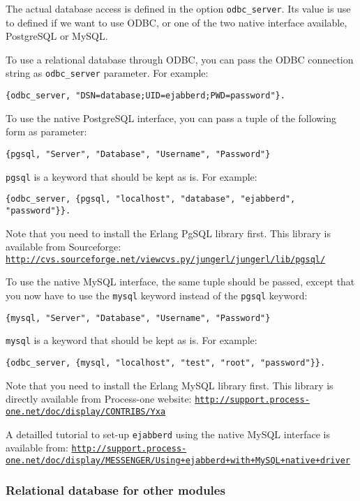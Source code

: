\documentclass[a4paper,10pt]{article}
\newcommand{\term}[1]{\texttt{#1}}
\newcommand{\ejabberd}{\texttt{ejabberd}}
\gdef\ahrefurl#1{\href{#1}{\texttt{#1}}}
\begin{document}
The actual database access is defined in the option \term{odbc\_server}. Its
value is use to defined if we want to use ODBC, or one of the two native
interface available, PostgreSQL or MySQL.

To use a relational database through ODBC, you can pass the ODBC connection
string as \term{odbc\_server} parameter. For example:
\begin{verbatim}
{odbc_server, "DSN=database;UID=ejabberd;PWD=password"}.
\end{verbatim}

To use the native PostgreSQL interface, you can pass a tuple of the following form as
parameter:
\begin{verbatim}
{pgsql, "Server", "Database", "Username", "Password"}
\end{verbatim}

\term{pgsql} is a keyword that should be kept as is. For example:
\begin{verbatim}
{odbc_server, {pgsql, "localhost", "database", "ejabberd", "password"}}.
\end{verbatim}

Note that you need to install the Erlang PgSQL library first. This library is
available from Sourceforge: \ahrefurl{http://cvs.sourceforge.net/viewcvs.py/jungerl/jungerl/lib/pgsql/}

To use the native MySQL interface, the same tuple should be passed, except
that you now have to use the \term{mysql} keyword instead of the \term{pgsql}
keyword:
\begin{verbatim}
{mysql, "Server", "Database", "Username", "Password"}
\end{verbatim}

\term{mysql} is a keyword that should be kept as is. For example:
\begin{verbatim}
{odbc_server, {mysql, "localhost", "test", "root", "password"}}.
\end{verbatim}

Note that you need to install the Erlang MySQL library first. This library is
directly available from Process-one website: \ahrefurl{http://support.process-one.net/doc/display/CONTRIBS/Yxa}

A detailled tutorial to set-up \ejabberd{} using the native MySQL interface is
available from: \ahrefurl{http://support.process-one.net/doc/display/MESSENGER/Using+ejabberd+with+MySQL+native+driver}

\subsubsection{Relational database for other modules}
\label{sec:relationaldatabaseextra}
\end{document}
